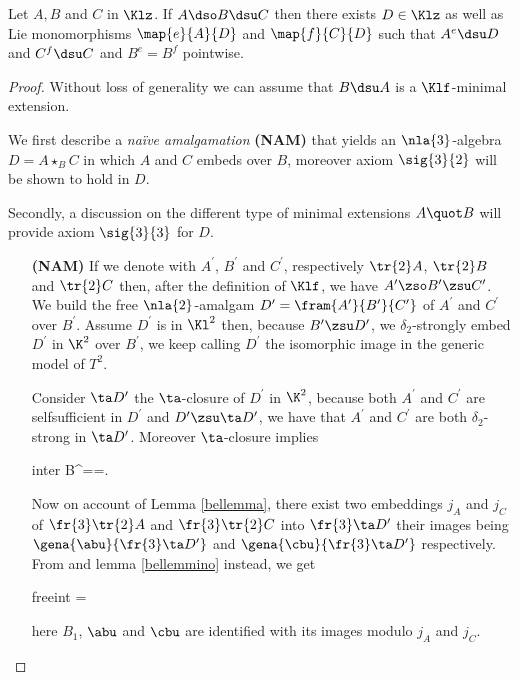 
\begin{lem}
Let $A,B$ and $C$ in $\Klz$. If $A\dso B\dsu C$ %
then there exists $D\in\Klz$ as well as
Lie monomorphisms $\map{e}{A}{D}$ and $\map{f}{C}{D}$
such that
$A^{e}\dsu D$ and $C^{f}\dsu C$ and $B^{e}=B^{f}$ pointwise.
\end{lem}

\begin{proof}
Without loss of generality we can assume that $B\dsu A$ is a $\Klf$-minimal extension.

We first describe a \emph{na\"{i}ve amalgamation} {\bf (NAM)} that yields an $\nla{3}$-algebra
$D=
A\star_{B}C$ in which $A$ and $C$ embeds over $B$, moreover axiom $\sig{3}{2}$ will be shown to hold in $D$.

Secondly, a discussion on the different type of minimal extensions $A\quot B$
will provide axiom $\sig{3}{3}$ for $D$.

\begin{itemize}
\item[{\bf (NAM)}]
If we denote with $A^{\prime}$, $B^{\prime}$ and $C^{\prime}$, respectively $\tr{2}A$, $\tr{2}B$ and
$\tr{2}C$ then, after the definition of $\Klf$, we have $A^{\prime}\zso B^{\prime}\zsu C^{\prime}$.
We build the free $\nla{2}$-amalgam $D^{\prime}=\fram{A^{\prime}}{B^{\prime}}{C^{\prime}}$ of $A^{\prime}$ and $C^{\prime}$ over $B^{\prime}$. Assume $D^{\prime}$ is in $\Kl^{2}$ then, because
$B^{\prime}\zsu D^{\prime}$,
we $\delta_{2}$-strongly embed $D^{\prime}$ in $\K^{2}$ over $B^{\prime}$,
we keep calling $D^{\prime}$ the isomorphic image in the generic model of $T^{2}$.

Consider $\ta D^{\prime}$ the $\ta$-closure of $D^{\prime}$ in $\K^{2}$,
because both $A^{\prime}$ and $C^{\prime}$ are selfsufficient in $D^{\prime}$
and $D^{\prime}\zsu\ta D^{\prime}$, we have that $A^{\prime}$ and $C^{\prime}$ are both $\delta_{2}$-strong
in $\ta D^{\prime}$. Moreover $\ta$-closure implies
\begin{labeq}{inter}
B^{\prime}==\cap{}.
\end{labeq}

Now on account of Lemma \ref{bellemma},
there exist two embeddings $j_{A}$ and $j_{C}$ of $\fr{3}\tr{2}A$ and $\fr{3}\tr{2}C$
into $\fr{3}\ta D^{\prime}$ their images being $\gena{\abu}{\fr{3}\ta D^{\prime}}$ and $\gena{\cbu}
{\fr{3}\ta D^{\prime}}$ respectively. From  and lemma \ref{bellemmino} instead, we get
\begin{labeq}{freeint}
=\cap{}
\end{labeq}
here $B_{1}$, $\abu$ and $\cbu$ are identified with its images modulo $j_{A}$ and $j_{C}$. 


\end{itemize}
\end{proof}
